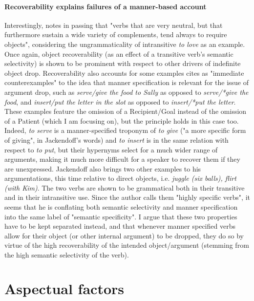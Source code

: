 \paragraph{Recoverability explains failures of a manner-based account}
Interestingly, \textcite[207]{Rice1988} notes in passing that "verbs that are very neutral, but that furthermore sustain a wide variety of complements, tend always to require objects", considering the ungrammaticality of intransitive \textit{to love} as an example. Once again, object recoverability (as an effect of a transitive verb's semantic selectivity) is shown to be prominent with respect to other drivers of indefinite object drop. Recoverability also accounts for some examples \textcite[134]{Jackendoff2003} cites as "immediate counterexamples" to the idea that manner specification is relevant for the issue of argument drop, such as \textit{serve/give the food to Sally} as opposed to \textit{serve/*give the food}, and \textit{insert/put the letter in the slot} as opposed to \textit{insert/*put the letter}. These examples feature the omission of a Recipient/Goal instead of the omission of a Patient (which I am focusing on), but the principle holds in this case too. Indeed, \textit{to serve} is a manner-specified troponym of \textit{to give} ("a more specific form of giving", in Jackendoff's words) and \textit{to insert} is in the same relation with respect to \textit{to put}, but their hypernyms select for a much wider range of arguments, making it much more difficult for a speaker to recover them if they are unexpressed. Jackendoff also brings two other examples to his argumentations, this time relative to direct objects, i.e. \textit{juggle (six balls), ﬂirt (with Kim)}. The two verbs are shown to be grammatical both in their transitive and in their intransitive use. Since the author calls them "highly specific verbs", it seems that he is conflating both semantic selectivity and manner specification into the same label of "semantic specificity". I argue that these two properties have to be kept separated instead, and that whenever manner specified verbs allow for their object (or other internal argument) to be dropped, they do so by virtue of the high recoverability of the intended object/argument (stemming from the high semantic selectivity of the verb).


\section{Aspectual factors} 


